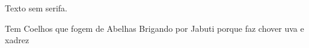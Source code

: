 \documentclass[a4paper]{article}
\newcommand{\frase}{Tem Coelhos que fogem de Abelhas Brigando por Jabuti porque faz chover uva e xadrez}
\begin{document}
  Texto sem serifa.

\frase
\end{document}
